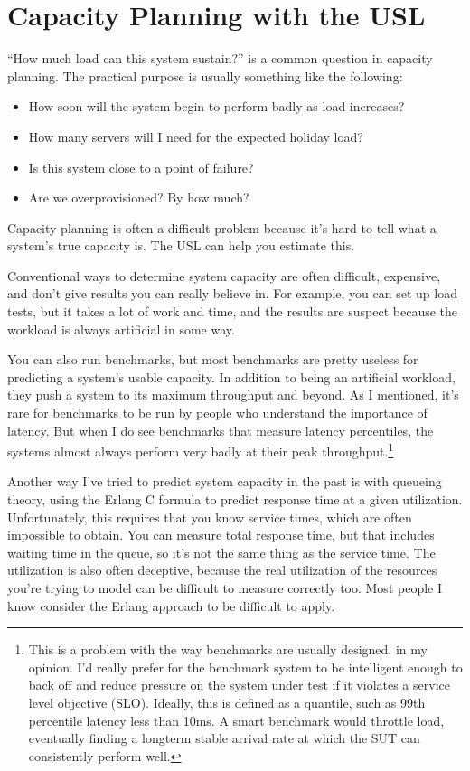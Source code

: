 \documentclass{vivid_layout}
\begin{document}
\newpage
\section{Capacity Planning with the USL}

``How much load can this system sustain?'' is a common question in capacity
planning. The practical purpose is usually something like the following:

\begin{itemize}
\item How soon will the system begin to perform badly as load increases?
\item How many servers will I need for the expected holiday load?
\item Is this system close to a point of failure?
\item Are we overprovisioned? By how much?
\end{itemize}

Capacity planning is often a difficult problem because it's hard to tell what a
system's true capacity is. The USL can help you estimate this.

Conventional ways to determine system capacity are often difficult, expensive,
and don't give results you can really believe in. For example, you can set up
load tests, but it takes a lot of work and time, and the results are suspect
because the workload is always artificial in some way.

You can also run benchmarks, but most benchmarks are pretty useless for
predicting a system's usable capacity. In addition to being an artificial
workload, they push a system to its maximum throughput and beyond. As I
mentioned, it's rare for benchmarks to be run by people who understand the
importance of latency. But when I do see benchmarks that measure latency
percentiles, the systems almost always perform very badly at their peak
throughput.\footnote{This is a problem with the way benchmarks are usually
designed, in my opinion. I'd really prefer for the benchmark system to be
intelligent enough to back off and reduce pressure on the system under test if
it violates a service level objective (SLO).  Ideally, this is defined as a
quantile, such as 99th percentile latency less than 10ms.  A smart benchmark
would throttle load, eventually finding a longterm stable arrival rate at which
the SUT can consistently perform well.}

Another way I've tried to predict system capacity in the past is with queueing
theory, using the Erlang C formula to predict response time at a given
utilization.  Unfortunately, this requires that you know service times,
which are often impossible to obtain. You can measure total response time, but
that includes waiting time in the queue, so it's not the same thing as the
service time. The utilization is also often deceptive, because the real
utilization of the resources you're trying to model can be difficult to
measure correctly too. Most people I know consider the Erlang approach to be
difficult to apply.
\end{document}
